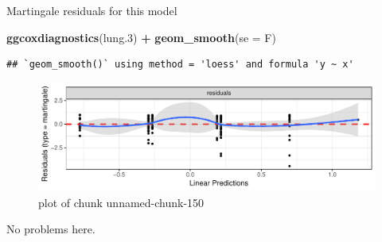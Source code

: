 \documentclass[ignorenonframetext,]{beamer}
\newenvironment{Shaded}{\begin{snugshade}}{\end{snugshade}}
\newcommand{\DataTypeTok}[1]{\textcolor[rgb]{0.13,0.29,0.53}{#1}}
\newcommand{\FloatTok}[1]{\textcolor[rgb]{0.00,0.00,0.81}{#1}}
\newcommand{\KeywordTok}[1]{\textcolor[rgb]{0.13,0.29,0.53}{\textbf{#1}}}
\newcommand{\NormalTok}[1]{#1}
\newcommand{\OperatorTok}[1]{\textcolor[rgb]{0.81,0.36,0.00}{\textbf{#1}}}
\newcommand{\StringTok}[1]{\textcolor[rgb]{0.31,0.60,0.02}{#1}}
\begin{document}
\begin{frame}[fragile]{Martingale residuals for this model}
\protect\hypertarget{martingale-residuals-for-this-model}{}

\begin{Shaded}
\begin{Highlighting}[]
\KeywordTok{ggcoxdiagnostics}\NormalTok{(lung}\FloatTok{.3}\NormalTok{) }\OperatorTok{+}\StringTok{ }\KeywordTok{geom_smooth}\NormalTok{(}\DataTypeTok{se =}\NormalTok{ F)}
\end{Highlighting}
\end{Shaded}

\begin{verbatim}
## `geom_smooth()` using method = 'loess' and formula 'y ~ x'
\end{verbatim}

\begin{figure}
\centering
\includegraphics{figure/unnamed-chunk-150-1.pdf}
\caption{plot of chunk unnamed-chunk-150}
\end{figure}

No problems here.

\end{frame}
\end{document}
